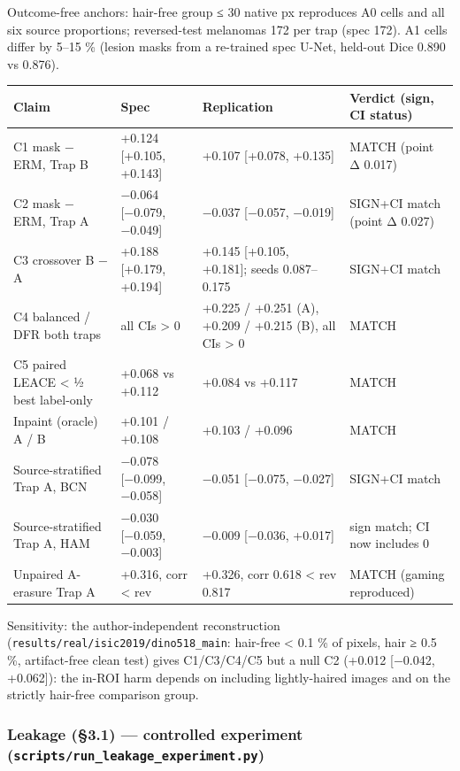 {Outcome-free anchors: hair-free group ≤ 30 native px reproduces A0 cells and all six source proportions;
reversed-test melanomas 172 per trap (spec 172). A1 cells differ by 5--15 \% (lesion masks from a re-trained
spec U-Net, held-out Dice 0.890 vs 0.876).

{ %
\begin{longtable}[]{@{}llll@{}}
\toprule\noalign{}
Claim & Spec & Replication & Verdict (sign, CI status) \\
\midrule\noalign{}
\endhead
\bottomrule\noalign{}
\endlastfoot
C1 mask − ERM, Trap B & +0.124 {[}+0.105, +0.143{]} & +0.107 {[}+0.078, +0.135{]} & MATCH (point Δ 0.017) \\
C2 mask − ERM, Trap A & −0.064 {[}−0.079, −0.049{]} & −0.037 {[}−0.057, −0.019{]} & SIGN+CI match (point Δ 0.027) \\
C3 crossover B − A & +0.188 {[}+0.179, +0.194{]} & +0.145 {[}+0.105, +0.181{]}; seeds 0.087--0.175 & SIGN+CI match \\
C4 balanced / DFR both traps & all CIs \textgreater{} 0 & +0.225 / +0.251 (A), +0.209 / +0.215 (B), all CIs \textgreater{} 0 & MATCH \\
C5 paired LEACE \textless{} ½ best label-only & +0.068 vs +0.112 & +0.084 vs +0.117 & MATCH \\
Inpaint (oracle) A / B & +0.101 / +0.108 & +0.103 / +0.096 & MATCH \\
Source-stratified Trap A, BCN & −0.078 {[}−0.099, −0.058{]} & −0.051 {[}−0.075, −0.027{]} & SIGN+CI match \\
Source-stratified Trap A, HAM & −0.030 {[}−0.059, −0.003{]} & −0.009 {[}−0.036, +0.017{]} & sign match; CI now includes 0 \\
Unpaired A-erasure Trap A & +0.316, corr \textless{} rev & +0.326, corr 0.618 \textless{} rev 0.817 & MATCH (gaming reproduced) \\
\end{longtable}
}

Sensitivity: the author-independent reconstruction (\texttt{results/real/isic2019/dino518\_main}: hair-free \textless{} 0.1 \%
of pixels, hair ≥ 0.5 \%, artifact-free clean test) gives C1/C3/C4/C5 but a null C2 (+0.012 {[}−0.042, +0.062{]}):
the in-ROI harm depends on including lightly-haired images and on the strictly hair-free comparison group.

\subsubsection{\texorpdfstring{Leakage (§3.1) --- controlled experiment (\texttt{scripts/run\_leakage\_experiment.py})}{Leakage (§3.1) --- controlled experiment (scripts/run\_leakage\_experiment.py)}}\label{leakage-31--controlled-experiment-scriptsrun_leakage_experimentpy}

}
